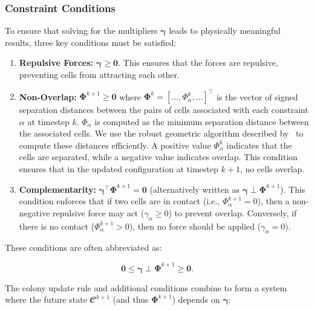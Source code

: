\documentclass[conference]{IEEEtran}
\begin{document}
\subsubsection{Constraint Conditions}

To ensure that solving for the multipliers $\boldsymbol{\gamma}$ leads to physically meaningful results, three key conditions must be satisfied:


\begin{enumerate}
    \item \textbf{Repulsive Forces:} $\boldsymbol{\gamma} \geq \mathbf{0}$. This ensures that the forces are repulsive, preventing cells from attracting each other.
    \item \textbf{Non-Overlap:} $\mathbf{\Phi}^{k+1} \geq \mathbf{0}$ where $\mathbf{\Phi}^k = [\dots, \Phi_\alpha^k, \dots]^\top$ is the vector of signed separation distances between the pairs of cells associated with each constraint $\alpha$ at timestep $k$.
          $\Phi_\alpha$ is computed as the minimum separation distance between the associated cells. We use the robust geometric algorithm described by~\cite{Yan2019, GeometricTools} to compute these distances efficiently.
          A positive value $\Phi_\alpha^k$ indicates that the cells are separated, while a negative value indicates overlap.
          This condition ensures that in the updated configuration at timestep $k+1$, no cells overlap.
    \item   \textbf{Complementarity:} $\boldsymbol{\gamma}^\top \mathbf{\Phi}^{k+1} = \mathbf{0}$ (alternatively written as $\boldsymbol{\gamma} \perp \mathbf{\Phi}^{k+1}$). This condition enforces that if two cells are in contact (i.e., $\Phi_\alpha^{k+1} = 0$), then a non-negative repulsive force may act ($\gamma_\alpha \geq 0$) to prevent overlap.
          Conversely, if there is no contact ($\Phi_\alpha^{k+1} > 0$), then no force should be applied ($\gamma_\alpha = 0$).
\end{enumerate}

These conditions are often abbreviated as:

\begin{equation}
    \mathbf{0} \leq \boldsymbol{\gamma} \perp \mathbf{\Phi}^{k+1} \geq \mathbf{0}.
\end{equation}


The colony update rule and additional conditions combine to form a system where the future state $\mathbfcal{C}^{k+1}$ (and thus $\mathbf{\Phi}^{k+1}$) depends on $\boldsymbol{\gamma}$:
\end{document}
